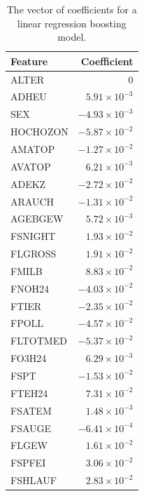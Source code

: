 \documentclass[twoside,twocolumn,10pt]{revtex4-1}
\begin{document}
	\begin{table}[H]
	\center
	\begin{tabular}{l r}
	\textbf{Feature} & \textbf{Coefficient} \\
	\hline
	ALTER & $0$ \\
	ADHEU & $5.91 \times 10^{-3}$ \\
	SEX & $-4.93 \times 10^{-3}$ \\
	HOCHOZON & $-5.87 \times 10^{-2}$ \\
	AMATOP & $-1.27 \times 10^{-2}$ \\
	AVATOP & $6.21 \times 10^{-3}$ \\
	ADEKZ & $-2.72 \times 10^{-2}$ \\
	ARAUCH & $-1.31 \times 10^{-2}$ \\
	AGEBGEW & $5.72 \times 10^{-3}$ \\
	FSNIGHT & $1.93 \times 10^{-2}$ \\
	FLGROSS & $1.91 \times 10^{-2}$ \\
	FMILB & $8.83 \times 10^{-2}$ \\
	FNOH24 & $-4.03 \times 10^{-2}$ \\
	FTIER & $-2.35 \times 10^{-2}$ \\
	FPOLL & $-4.57 \times 10^{-2}$ \\
	FLTOTMED & $-5.37 \times 10^{-2}$ \\
	FO3H24 & $6.29 \times 10^{-3}$ \\
	FSPT & $-1.53 \times 10^{-2}$ \\
	FTEH24 & $7.31 \times 10^{-2}$ \\
	FSATEM & $1.48 \times 10^{-3}$ \\
	FSAUGE & $-6.41 \times 10^{-4}$ \\
	FLGEW & $1.61 \times 10^{-2}$ \\
	FSPFEI & $3.06 \times 10^{-2}$ \\
	FSHLAUF & $2.83 \times 10^{-2}$
	\end{tabular}
	\caption{The vector of coefficients for a linear regression boosting model.\label{table_7}}
	\end{table}	
	
\end{document}
